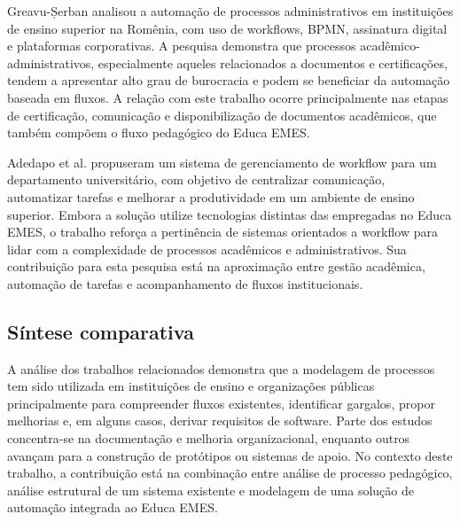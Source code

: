 Greavu-Șerban \cite{GreavuSerban2015} analisou a automação de processos administrativos em instituições de ensino superior na Romênia, com uso de workflows, BPMN, assinatura digital e plataformas corporativas. A pesquisa demonstra que processos acadêmico-administrativos, especialmente aqueles relacionados a documentos e certificações, tendem a apresentar alto grau de burocracia e podem se beneficiar da automação baseada em fluxos. A relação com este trabalho ocorre principalmente nas etapas de certificação, comunicação e disponibilização de documentos acadêmicos, que também compõem o fluxo pedagógico do Educa EMES.

Adedapo et al. \cite{AdedapoEtAl2023} propuseram um sistema de gerenciamento de workflow para um departamento universitário, com objetivo de centralizar comunicação, automatizar tarefas e melhorar a produtividade em um ambiente de ensino superior. Embora a solução utilize tecnologias distintas das empregadas no Educa EMES, o trabalho reforça a pertinência de sistemas orientados a workflow para lidar com a complexidade de processos acadêmicos e administrativos. Sua contribuição para esta pesquisa está na aproximação entre gestão acadêmica, automação de tarefas e acompanhamento de fluxos institucionais.

\subsection{Síntese comparativa}
\label{sec:trabalhos-relacionados:sintese}

A análise dos trabalhos relacionados demonstra que a modelagem de processos tem sido utilizada em instituições de ensino e organizações públicas principalmente para compreender fluxos existentes, identificar gargalos, propor melhorias e, em alguns casos, derivar requisitos de software. Parte dos estudos concentra-se na documentação e melhoria organizacional, enquanto outros avançam para a construção de protótipos ou sistemas de apoio. No contexto deste trabalho, a contribuição está na combinação entre análise de processo pedagógico, análise estrutural de um sistema existente e modelagem de uma solução de automação integrada ao Educa EMES.

